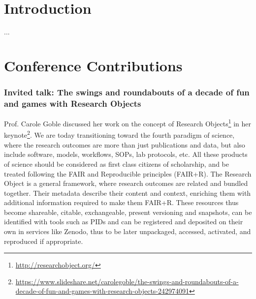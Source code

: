 \documentclass[sigconf, nonacm]{acmart}
\begin{document}


\maketitle

\section{Introduction}
...

\section{Conference Contributions}
\subsubsection*{Invited talk: The swings and roundabouts of a decade of fun and games with Research Objects} Prof. Carole Goble discussed her work on the concept of Research Objects\footnote{\url{http://researchobject.org/}}\cite{bechhofer2013linked} in her keynote\footnote{\url{https://www.slideshare.net/carolegoble/the-swings-and-roundabouts-of-a-decade-of-fun-and-games-with-research-objects-242974091}}. We are today transitioning toward the fourth paradigm of science, where the research outcomes are more than just publications and data, but also include software, models, workflows, SOPs, lab protocols, etc. All these products of science should be considered as first class citizens of scholarship, and be treated following the FAIR and Reproducible principles (FAIR+R). 
The Research Object is a general framework, where research outcomes are related and bundled together. Their metadata describe their content and context, enriching them with additional information required to make them FAIR+R. These resources thus become shareable, citable, exchangeable, present versioning and snapshots, can be identified with tools such as PIDs and can be registered and deposited on their own in services like Zenodo, thus to be later unpackaged, accessed, activated, and reproduced if appropriate. 
\end{document}
